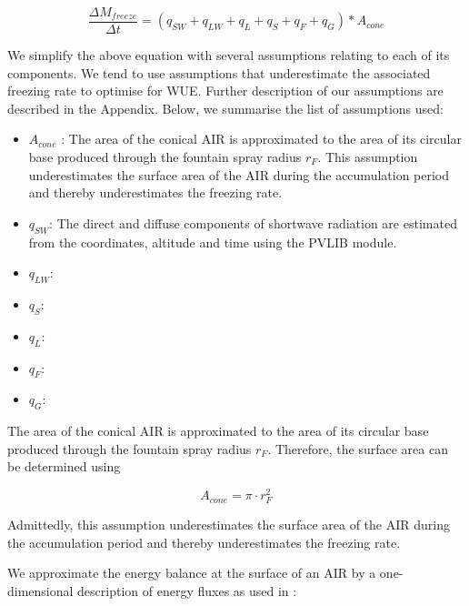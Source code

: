 \documentclass[utf8]{frontiersSCNS}
\begin{document}
\begin{equation}
	 \frac{\Delta M_{freeze}}{\Delta t}  = (q_{SW} + q_{LW} + q_{L} + q_{S} + q_{F} + q_{G}) * A_{cone}
	\label{eqn:freeze}
\end{equation}

We simplify the above equation with several assumptions relating to each of its components. We tend to use
assumptions that underestimate the associated freezing rate to optimise for WUE. Further description of our
assumptions are described in the Appendix. Below, we summarise the list of assumptions used:

\begin{itemize}
  \item $A_{cone}$ : The area of the conical AIR is approximated to the area of its circular base produced through the fountain spray
radius $r_F$. This assumption underestimates the surface area of the AIR during the accumulation period and
thereby underestimates the freezing rate.

  \item $q_{SW}$: The direct and diffuse components of shortwave radiation are estimated from the coordinates,
    altitude and time using the PVLIB module.

  \item $q_{LW}$: 

  \item $q_{S}$:

  \item $q_{L}$:

  \item $q_{F}$:

  \item $q_{G}$:

\end{itemize}


The area of the conical AIR is approximated to the area of its circular base produced through the fountain spray
radius $r_F$. Therefore, the surface area can be determined using

\begin{equation} A_{cone} =\pi \cdot r_{F}^2 \label{eq:Area} \end{equation}

Admittedly, this assumption underestimates the surface area of the AIR during the accumulation period and
thereby underestimates the freezing rate.

We approximate the energy balance at the surface of an AIR by a one-dimensional description of energy fluxes as
used in \cite{Balasubramanian_2022}:
\end{document}
